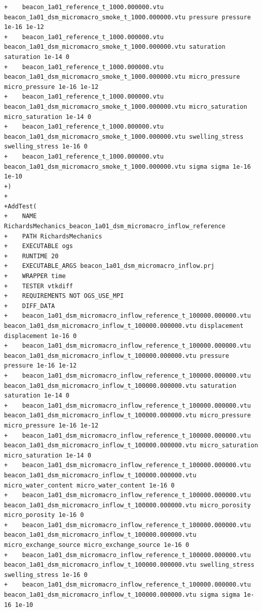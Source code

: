 \documentclass[10pt]{article}
\begin{document}
\begin{lstlisting}
+    beacon_1a01_reference_t_1000.000000.vtu beacon_1a01_dsm_micromacro_smoke_t_1000.000000.vtu pressure pressure 1e-16 1e-12
+    beacon_1a01_reference_t_1000.000000.vtu beacon_1a01_dsm_micromacro_smoke_t_1000.000000.vtu saturation saturation 1e-14 0
+    beacon_1a01_reference_t_1000.000000.vtu beacon_1a01_dsm_micromacro_smoke_t_1000.000000.vtu micro_pressure micro_pressure 1e-16 1e-12
+    beacon_1a01_reference_t_1000.000000.vtu beacon_1a01_dsm_micromacro_smoke_t_1000.000000.vtu micro_saturation micro_saturation 1e-14 0
+    beacon_1a01_reference_t_1000.000000.vtu beacon_1a01_dsm_micromacro_smoke_t_1000.000000.vtu swelling_stress swelling_stress 1e-16 0
+    beacon_1a01_reference_t_1000.000000.vtu beacon_1a01_dsm_micromacro_smoke_t_1000.000000.vtu sigma sigma 1e-16 1e-10
+)
+
+AddTest(
+    NAME RichardsMechanics_beacon_1a01_dsm_micromacro_inflow_reference
+    PATH RichardsMechanics
+    EXECUTABLE ogs
+    RUNTIME 20
+    EXECUTABLE_ARGS beacon_1a01_dsm_micromacro_inflow.prj
+    WRAPPER time
+    TESTER vtkdiff
+    REQUIREMENTS NOT OGS_USE_MPI
+    DIFF_DATA
+    beacon_1a01_dsm_micromacro_inflow_reference_t_100000.000000.vtu beacon_1a01_dsm_micromacro_inflow_t_100000.000000.vtu displacement displacement 1e-16 0
+    beacon_1a01_dsm_micromacro_inflow_reference_t_100000.000000.vtu beacon_1a01_dsm_micromacro_inflow_t_100000.000000.vtu pressure pressure 1e-16 1e-12
+    beacon_1a01_dsm_micromacro_inflow_reference_t_100000.000000.vtu beacon_1a01_dsm_micromacro_inflow_t_100000.000000.vtu saturation saturation 1e-14 0
+    beacon_1a01_dsm_micromacro_inflow_reference_t_100000.000000.vtu beacon_1a01_dsm_micromacro_inflow_t_100000.000000.vtu micro_pressure micro_pressure 1e-16 1e-12
+    beacon_1a01_dsm_micromacro_inflow_reference_t_100000.000000.vtu beacon_1a01_dsm_micromacro_inflow_t_100000.000000.vtu micro_saturation micro_saturation 1e-14 0
+    beacon_1a01_dsm_micromacro_inflow_reference_t_100000.000000.vtu beacon_1a01_dsm_micromacro_inflow_t_100000.000000.vtu micro_water_content micro_water_content 1e-16 0
+    beacon_1a01_dsm_micromacro_inflow_reference_t_100000.000000.vtu beacon_1a01_dsm_micromacro_inflow_t_100000.000000.vtu micro_porosity micro_porosity 1e-16 0
+    beacon_1a01_dsm_micromacro_inflow_reference_t_100000.000000.vtu beacon_1a01_dsm_micromacro_inflow_t_100000.000000.vtu micro_exchange_source micro_exchange_source 1e-16 0
+    beacon_1a01_dsm_micromacro_inflow_reference_t_100000.000000.vtu beacon_1a01_dsm_micromacro_inflow_t_100000.000000.vtu swelling_stress swelling_stress 1e-16 0
+    beacon_1a01_dsm_micromacro_inflow_reference_t_100000.000000.vtu beacon_1a01_dsm_micromacro_inflow_t_100000.000000.vtu sigma sigma 1e-16 1e-10

\end{lstlisting}
\end{document}
